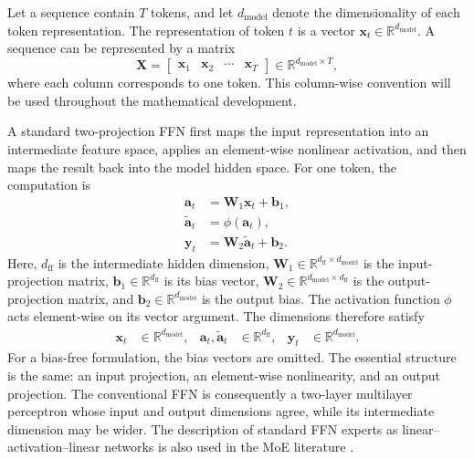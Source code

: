 Let a sequence contain \(T\) tokens, and let
\(d_{\mathrm{model}}\) denote the dimensionality of each token
representation. The representation of token \(t\) is a vector
\(\mathbf{x}_t\in\mathbb{R}^{d_{\mathrm{model}}}\). A sequence can be
represented by a matrix
\[
    \mathbf{X}
    =
    \begin{bmatrix}
        \mathbf{x}_1 & \mathbf{x}_2 & \cdots & \mathbf{x}_T
    \end{bmatrix}
    \in
    \mathbb{R}^{d_{\mathrm{model}}\times T},
\]
where each column corresponds to one token. This column-wise convention
will be used throughout the mathematical development.

A standard two-projection FFN first maps the input representation into an
intermediate feature space, applies an element-wise nonlinear activation,
and then maps the result back into the model hidden space. For one token,
the computation is
\begin{align}
    \mathbf{a}_t
    &=
    \mathbf{W}_1\mathbf{x}_t+\mathbf{b}_1,
    \label{eq:ffn-first-projection}\\
    \widetilde{\mathbf{a}}_t
    &=
    \phi(\mathbf{a}_t),
    \label{eq:ffn-elementwise-activation}\\
    \mathbf{y}_t
    &=
    \mathbf{W}_2\widetilde{\mathbf{a}}_t+\mathbf{b}_2.
    \label{eq:ffn-second-projection}
\end{align}
Here, \(d_{\mathrm{ff}}\) is the intermediate hidden dimension,
\(\mathbf{W}_1\in\mathbb{R}^{d_{\mathrm{ff}}\times d_{\mathrm{model}}}\)
is the input-projection matrix,
\(\mathbf{b}_1\in\mathbb{R}^{d_{\mathrm{ff}}}\) is its bias vector,
\(\mathbf{W}_2\in\mathbb{R}^{d_{\mathrm{model}}\times d_{\mathrm{ff}}}\)
is the output-projection matrix, and
\(\mathbf{b}_2\in\mathbb{R}^{d_{\mathrm{model}}}\) is the output bias.
The activation function \(\phi\) acts element-wise on its vector argument.
The dimensions therefore satisfy
\[
\begin{aligned}
    \mathbf{x}_t
        &\in \mathbb{R}^{d_{\mathrm{model}}},&
    \mathbf{a}_t,\widetilde{\mathbf{a}}_t
        &\in \mathbb{R}^{d_{\mathrm{ff}}},&
    \mathbf{y}_t
        &\in \mathbb{R}^{d_{\mathrm{model}}}.
\end{aligned}
\]
For a bias-free formulation, the bias vectors are omitted. The essential
structure is the same: an input projection, an element-wise nonlinearity,
and an output projection. The conventional FFN is consequently a
two-layer multilayer perceptron whose input and output dimensions agree,
while its intermediate dimension may be wider. The description of standard
FFN experts as linear--activation--linear networks is also used in the
MoE literature \parencite{dai2024deepseekmoe,cai2025survey}.


